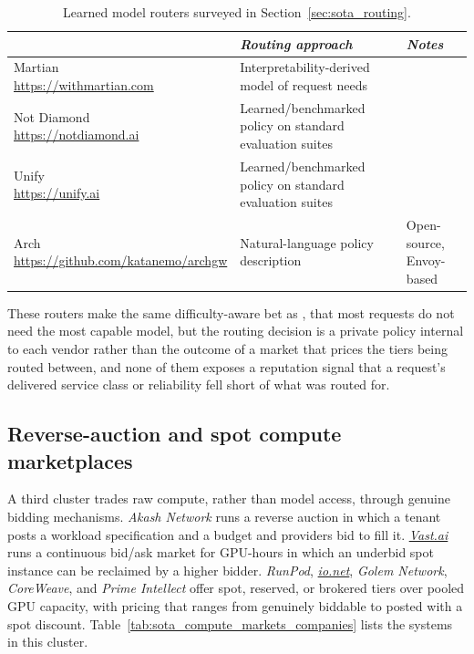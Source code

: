 \begin{samepage}
  \begin{table}[H]
    \centering
    \footnotesize
    \begin{tabular}{l|p{3.4cm}|p{3.1cm}|}
                    & \emph{Routing approach} & \emph{Notes} \\
      \hline
      \makecell[l]{Martian \\ {\scriptsize\url{https://withmartian.com}}}
        & Interpretability-derived model of request needs & \\
      \hline
      \makecell[l]{Not Diamond \\ {\scriptsize\url{https://notdiamond.ai}}}
        & Learned/benchmarked policy on standard evaluation suites & \\
      \hline
      \makecell[l]{Unify \\ {\scriptsize\url{https://unify.ai}}}
        & Learned/benchmarked policy on standard evaluation suites & \\
      \hline
      \makecell[l]{Arch \\ {\scriptsize\url{https://github.com/katanemo/archgw}}}
        & Natural-language policy description & Open-source, Envoy-based \\
      \hline
    \end{tabular}
    \caption{Learned model routers surveyed in Section~\ref{sec:sota_routing}.}
    \label{tab:sota_routing_companies}
  \end{table}
\end{samepage}

These routers make the same difficulty-aware bet as \NoesisServer, that most
requests do not need the most capable model, but the routing decision is a
private policy internal to each vendor rather than the outcome of a market
that prices the tiers being routed between, and none of them exposes a
reputation signal that a request's delivered service class or
reliability fell short of what was routed for.

\subsection{Reverse-auction and spot compute marketplaces}
\label{sec:sota_compute_markets}

A third cluster trades raw compute, rather than model access, through
genuine bidding mechanisms. \emph{Akash Network} runs a reverse auction in
which a tenant posts a workload specification and a budget and providers
bid to fill it. \emph{\href{https://vast.ai}{Vast.ai}} runs a continuous bid/ask market for
GPU-hours in which an underbid spot instance can be reclaimed by a higher
bidder. \emph{RunPod}, \emph{\href{https://io.net}{io.net}}, \emph{Golem Network},
\emph{CoreWeave}, and \emph{Prime Intellect} offer spot, reserved, or
brokered tiers over pooled GPU capacity, with pricing that ranges from
genuinely biddable to posted with a spot discount.
Table~\ref{tab:sota_compute_markets_companies} lists the systems in this
cluster.

